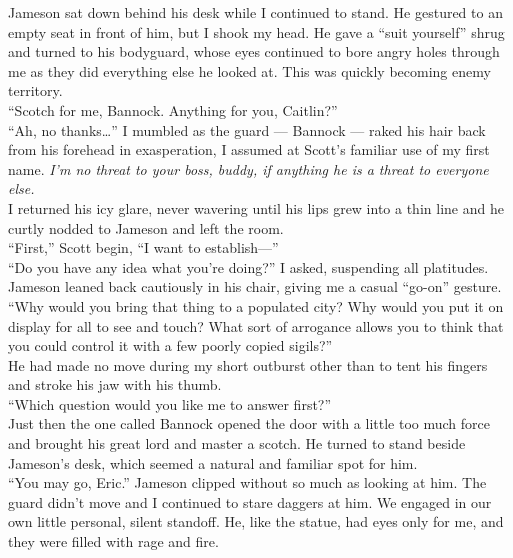 \documentclass[a5paper]{scrartcl}
\begin{document}
Jameson sat down behind his desk while I continued to stand. He gestured to an empty seat in front of him, but I shook my head. He gave a \enquote{suit yourself} shrug and turned to his bodyguard, whose eyes continued to bore angry holes through me as they did everything else he looked at. This was quickly becoming enemy territory.\\


\enquote{Scotch for me, Bannock. Anything for you, Caitlin?}\\


\enquote{Ah, no thanks\dots } I mumbled as the guard --- Bannock --- raked his hair back from his forehead in exasperation, I assumed at Scott's familiar use of my first name. \textit{I'm no threat to your boss, buddy, if anything he is a threat to everyone else.}
\\


I returned his icy glare, never wavering until his lips grew into a thin line and he curtly nodded to Jameson and left the room.\\


\enquote{First,} Scott begin, \enquote{I want to establish---}\\


\enquote{Do you have any idea what you're doing?} I asked, suspending all platitudes.\\


Jameson leaned back cautiously in his chair, giving me a casual \enquote{go-on} gesture.\\


\enquote{Why would you bring that thing to a populated city? Why would you put it on display for all to see and touch? What sort of arrogance allows you to think that you could control it with a few poorly copied sigils?}\\


He had made no move during my short outburst other than to tent his fingers and stroke his jaw with his thumb.\\


\enquote{Which question would you like me to answer first?}\\


Just then the one called Bannock opened the door with a little too much force and brought his great lord and master a scotch. He turned to stand beside Jameson's desk, which seemed a natural and familiar spot for him.\\


\enquote{You may go, Eric.} Jameson clipped without so much as looking at him. The guard didn't move and I continued to stare daggers at him. We engaged in our own little personal, silent standoff. He, like the statue, had eyes only for me, and they were filled with rage and fire.\\
\end{document}
